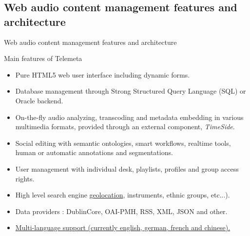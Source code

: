 \documentclass[final, hyperref, table]{beamer}
\begin{document}
\subsection{Web audio content management features and architecture}
\begin{frame}[label=telemeta_features]{Web audio content management features and architecture}
  \begin{block}{Main features of Telemeta}
    \begin{itemize}
      \item \alert{Pure HTML5} web user interface including dynamic forms.
      \item Database management through Strong Structured Query Language (\alert{SQL}) or Oracle backend.
      \item \alert{On-the-fly audio analyzing}, transcoding and metadata
        embedding in various multimedia formats, provided through an external component, \emph{TimeSide}.
      \item Social editing with semantic ontologies, smart workflows,
        realtime tools, human or automatic annotations and
        segmentations.
      \item \alert{User management} with individual desk, playlists, profiles
        and group access rights.
      \item High level \alert{search engine} \hyperlink{geonavigator}{geolocation}, instruments, ethnic groups, etc...).
      \item Data providers : DublinCore, OAI-PMH, RSS, XML, JSON and other.
      \item \hyperlink{telemeta_languages}{Multi-language support (currently english, german, french and chinese).}
      \end{itemize}
  \end{block}
\end{frame}
\end{document}
